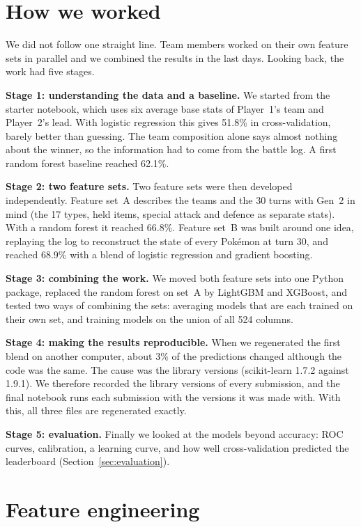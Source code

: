 \documentclass[11pt,a4paper]{article}
\begin{document}
\section{How we worked}

We did not follow one straight line. Team members worked on their own feature sets in parallel and
we combined the results in the last days. Looking back, the work had five stages.

\textbf{Stage 1: understanding the data and a baseline.} We started from the starter notebook, which
uses six average base stats of Player~1's team and Player~2's lead. With logistic regression this
gives 51.8\% in cross-validation, barely better than guessing. The team composition alone says
almost nothing about the winner, so the information had to come from the battle log. A first random
forest baseline reached 62.1\%.

\textbf{Stage 2: two feature sets.} Two feature sets were then developed independently. Feature
set~A describes the teams and the 30 turns with Gen~2 in mind (the 17 types, held items, special
attack and defence as separate stats). With a random forest it reached 66.8\%. Feature set~B was
built around one idea, replaying the log to reconstruct the state of every Pokémon at turn 30, and
reached 68.9\% with a blend of logistic regression and gradient boosting.

\textbf{Stage 3: combining the work.} We moved both feature sets into one Python package, replaced
the random forest on set~A by LightGBM and XGBoost, and tested two ways of combining the sets:
averaging models that are each trained on their own set, and training models on the union of all
524 columns.

\textbf{Stage 4: making the results reproducible.} When we regenerated the first blend on another
computer, about 3\% of the predictions changed although the code was the same. The cause was the
library versions (scikit-learn 1.7.2 against 1.9.1). We therefore recorded the library versions of every
submission, and the final notebook runs each submission with the versions it was made with. With
this, all three files are regenerated exactly.

\textbf{Stage 5: evaluation.} Finally we looked at the models beyond accuracy: ROC curves,
calibration, a learning curve, and how well cross-validation predicted the leaderboard
(Section~\ref{sec:evaluation}).

\section{Feature engineering}
\end{document}
